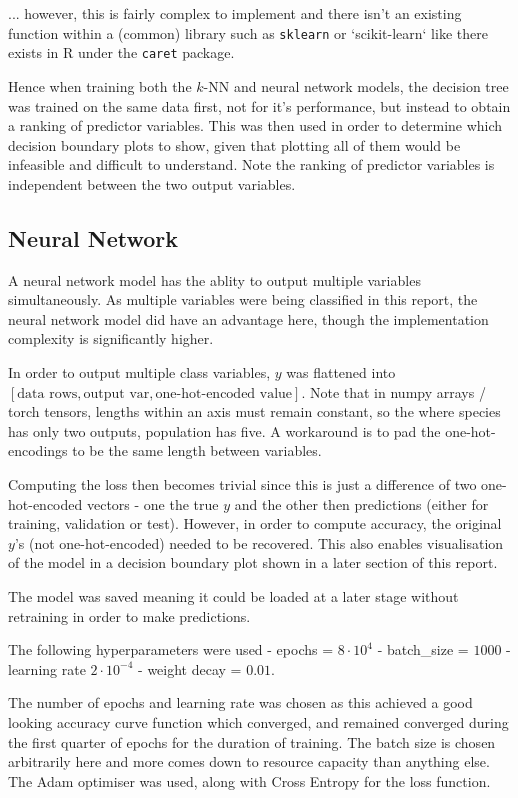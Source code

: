 \documentclass{article}
\begin{document}
... however, this is fairly complex to implement and there isn't an existing function within a (common) library such as \texttt{sklearn} or `scikit-learn` like there exists in R under the \texttt{caret} package.

Hence when training both the $k$-NN and neural network models, the decision tree was trained on the same data first, not for it's performance, but instead to obtain a ranking of predictor variables. This was then used in order to determine which decision boundary plots to show, given that plotting all of them would be infeasible and difficult to understand. Note the ranking of predictor variables is independent between the two output variables.

\subsection{Neural Network}

A neural network model has the ablity to output multiple variables simultaneously. As multiple variables were being classified in this report, the neural network model did have an advantage here, though the implementation complexity is significantly higher. 

In order to output multiple class variables, $y$ was flattened into $\left[\text{data rows}, \text{output var}, \text{one-hot-encoded value}\right]$. Note that in numpy arrays / torch tensors, lengths within an axis must remain constant, so the where species has only two outputs, population has five. A workaround is to pad the one-hot-encodings to be the same length between variables. 

Computing the loss then becomes trivial since this is just a difference of two one-hot-encoded vectors - one the true $y$ and the other then predictions (either for training, validation or test). However, in order to compute accuracy, the original $y$'s (not one-hot-encoded) needed to be recovered. This also enables visualisation of the model in a decision boundary plot shown in a later section of this report.

The model was saved meaning it could be loaded at a later stage without retraining in order to make predictions.

The following hyperparameters were used
- epochs = $8 \cdot 10^4$
- batch_size = $1000$
- learning rate $2 \cdot 10^{-4}$
- weight decay = $0.01$.

The number of epochs and learning rate was chosen as this achieved a good looking accuracy curve function which converged, and remained converged during the first quarter of epochs for the duration of training. The batch size is chosen arbitrarily here and more comes down to resource capacity than anything else. The Adam optimiser was used, along with Cross Entropy for the loss function.
\end{document}
